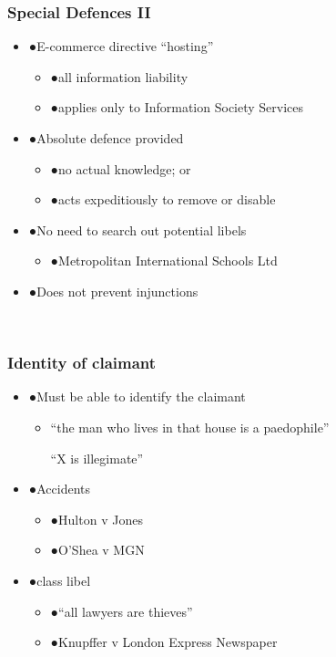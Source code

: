 \documentclass[ignorenonframetext,]{beamer}
\begin{document}
\begin{frame}
\frametitle{Special Defences II}

\begin{itemize}
\item  {●}E-commerce directive ``hosting''

  \begin{itemize}
  \item    {●}all information liability
  \item    {●}applies only to Information Society Services
  \end{itemize}
\item  {●}Absolute defence provided

  \begin{itemize}
  \item    {●}no actual knowledge; or
  \item    {●}acts expeditiously to remove or disable
  \end{itemize}
\item  {●}{No need to search out potential libels}

  \begin{itemize}
  \item    {●}{Metropolitan International Schools Ltd}
  \end{itemize}
\item  {●}Does not prevent injunctions
\end{itemize}

~


\end{frame}

\begin{frame}
\frametitle{Identity of claimant}

\begin{itemize}
\item  {●}Must be able to identify the claimant

  \begin{itemize}
  \item    ``the man who lives in that house is a paedophile''

    ``X is illegimate''
  \end{itemize}
\item  {●}Accidents

  \begin{itemize}
  \item    {●}Hulton v Jones 
  \item    {●}O'Shea v MGN
  \end{itemize}
\item  {●}class libel 

  \begin{itemize}
  \item    {●}``all lawyers are thieves''
  \item    {●}Knupffer v London Express Newspaper
  \end{itemize}
\end{itemize}

~


\end{frame}
\end{document}
